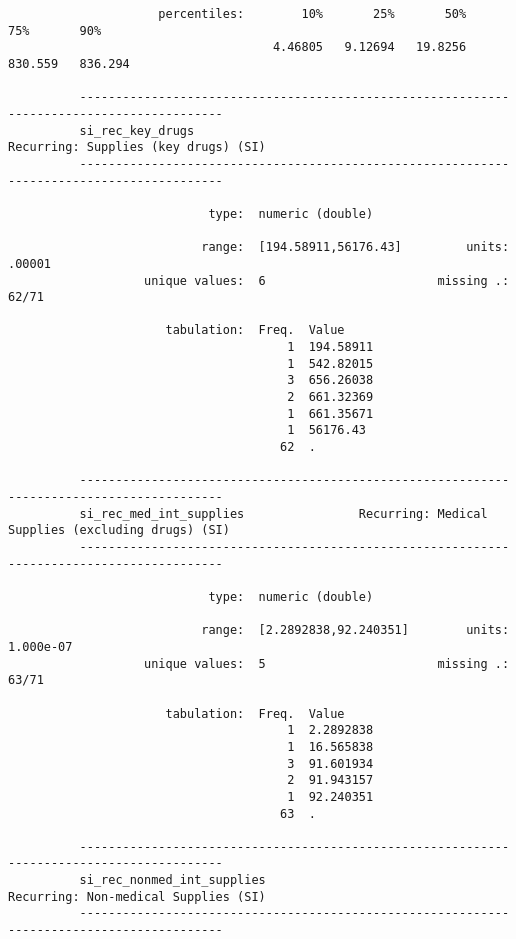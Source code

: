 \documentclass{article}
\begin{document}
\begin{verbatim}
                     percentiles:        10%       25%       50%       75%       90%
                                     4.46805   9.12694   19.8256   830.559   836.294
          
          ------------------------------------------------------------------------------------------
          si_rec_key_drugs                                      Recurring: Supplies (key drugs) (SI)
          ------------------------------------------------------------------------------------------
          
                            type:  numeric (double)
          
                           range:  [194.58911,56176.43]         units:  .00001
                   unique values:  6                        missing .:  62/71
          
                      tabulation:  Freq.  Value
                                       1  194.58911
                                       1  542.82015
                                       3  656.26038
                                       2  661.32369
                                       1  661.35671
                                       1  56176.43
                                      62  .
          
          ------------------------------------------------------------------------------------------
          si_rec_med_int_supplies                Recurring: Medical Supplies (excluding drugs) (SI)
          ------------------------------------------------------------------------------------------
          
                            type:  numeric (double)
          
                           range:  [2.2892838,92.240351]        units:  1.000e-07
                   unique values:  5                        missing .:  63/71
          
                      tabulation:  Freq.  Value
                                       1  2.2892838
                                       1  16.565838
                                       3  91.601934
                                       2  91.943157
                                       1  92.240351
                                      63  .
          
          ------------------------------------------------------------------------------------------
          si_rec_nonmed_int_supplies                            Recurring: Non-medical Supplies (SI)
          ------------------------------------------------------------------------------------------
          

\end{verbatim}
\end{document}
